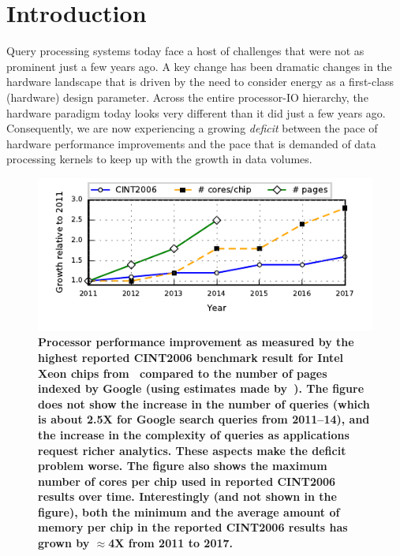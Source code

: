 
\section{Introduction}
Query processing systems today face a host of challenges that were not as prominent just a few years ago. A key change has been dramatic changes in the hardware landscape that is driven by the need to consider energy as a first-class (hardware) design parameter. Across the entire processor-IO hierarchy, the hardware paradigm today looks very different than it did just a few years ago. Consequently, we are now experiencing a growing \textit{deficit} between the pace of hardware performance improvements and the pace that is demanded of data processing kernels to keep up with the growth in data volumes.

\begin{figure}
\centering
   \includegraphics[width=\columnwidth]{system/figures/deficit.pdf}
   \vspace*{-2em}
   \caption{\textbf{Processor performance improvement as measured by the highest reported CINT2006 benchmark result for Intel Xeon chips from~\cite{cpu2006} compared to the number of pages indexed by Google (using estimates made by~\cite{google-pages-db}). The figure does not show the increase in the number of queries (which is about 2.5X for Google search queries from 2011--14), and the increase in the complexity of queries as applications request richer analytics. These aspects make the deficit problem worse. The figure also shows the maximum number of cores per chip used in reported CINT2006 results over time. Interestingly (and not shown in the figure), both the minimum and the average amount of memory per chip in the reported CINT2006 results has grown by $\approx$4X from 2011 to 2017.}}
   \label{fig-deficit}
\end{figure}

